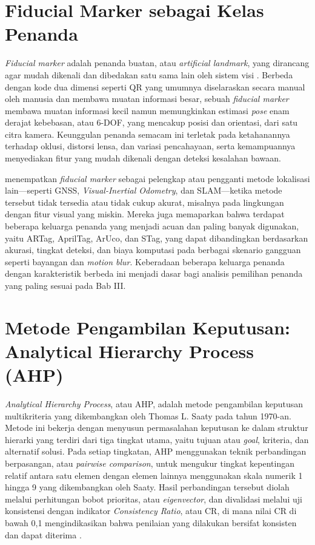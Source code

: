 \section{Fiducial Marker sebagai Kelas Penanda}
\label{sec:fiducial-marker}

\textit{Fiducial marker} adalah penanda buatan, atau \textit{artificial landmark}, yang dirancang agar mudah dikenali dan dibedakan satu sama lain oleh sistem visi \autocite{olson2011}. Berbeda dengan kode dua dimensi seperti QR yang umumnya diselaraskan secara manual oleh manusia dan membawa muatan informasi besar, sebuah \textit{fiducial marker} membawa muatan informasi kecil namun memungkinkan estimasi \textit{pose} enam derajat kebebasan, atau 6-DOF, yang mencakup posisi dan orientasi, dari satu citra kamera. Keunggulan penanda semacam ini terletak pada ketahanannya terhadap oklusi, distorsi lensa, dan variasi pencahayaan, serta kemampuannya menyediakan fitur yang mudah dikenali dengan deteksi kesalahan bawaan.

\textcite{kalaitzakis2021} menempatkan \textit{fiducial marker} sebagai pelengkap atau pengganti metode lokalisasi lain---seperti GNSS, \textit{Visual-Inertial Odometry}, dan SLAM---ketika metode tersebut tidak tersedia atau tidak cukup akurat, misalnya pada lingkungan dengan fitur visual yang miskin. Mereka juga memaparkan bahwa terdapat beberapa keluarga penanda yang menjadi acuan dan paling banyak digunakan, yaitu ARTag, AprilTag, ArUco, dan STag, yang dapat dibandingkan berdasarkan akurasi, tingkat deteksi, dan biaya komputasi pada berbagai skenario gangguan seperti bayangan dan \textit{motion blur}. Keberadaan beberapa keluarga penanda dengan karakteristik berbeda ini menjadi dasar bagi analisis pemilihan penanda yang paling sesuai pada Bab III.

\section{Metode Pengambilan Keputusan: Analytical Hierarchy Process (AHP)}
\label{sec:ahp}

\textit{Analytical Hierarchy Process}, atau AHP, adalah metode pengambilan keputusan multikriteria yang dikembangkan oleh Thomas L. Saaty pada tahun 1970-an. Metode ini bekerja dengan menyusun permasalahan keputusan ke dalam struktur hierarki yang terdiri dari tiga tingkat utama, yaitu tujuan atau \textit{goal}, kriteria, dan alternatif solusi. Pada setiap tingkatan, AHP menggunakan teknik perbandingan berpasangan, atau \textit{pairwise comparison}, untuk mengukur tingkat kepentingan relatif antara satu elemen dengan elemen lainnya menggunakan skala numerik 1 hingga 9 yang dikembangkan oleh Saaty. Hasil perbandingan tersebut diolah melalui perhitungan bobot prioritas, atau \textit{eigenvector}, dan divalidasi melalui uji konsistensi dengan indikator \textit{Consistency Ratio}, atau CR, di mana nilai CR di bawah 0,1 mengindikasikan bahwa penilaian yang dilakukan bersifat konsisten dan dapat diterima \autocite{saaty1977}.

